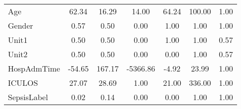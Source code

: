 \begin{longtable}{lcccccc}
Age              &  62.34 &              16.29 &    14.00 &  64.24 &  100.00 &            1.00 \\
Gender           &   0.57 &               0.50 &     0.00 &   1.00 &    1.00 &            1.00 \\
Unit1            &   0.50 &               0.50 &     0.00 &   1.00 &    1.00 &            0.57 \\
Unit2            &   0.50 &               0.50 &     0.00 &   0.00 &    1.00 &            0.57 \\
HospAdmTime      & -54.65 &             167.17 & -5366.86 &  -4.92 &   23.99 &            1.00 \\
ICULOS           &  27.07 &              28.69 &     1.00 &  21.00 &  336.00 &            1.00 \\
SepsisLabel      &   0.02 &               0.14 &     0.00 &   0.00 &    1.00 &            1.00 \\
\end{longtable}
